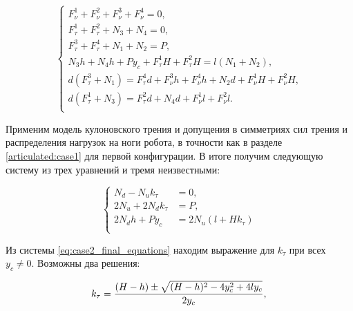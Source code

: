 \begin{equation}
  \label{articulated:case2_initial}
\left\{
  \begin{alignedat}{3}
    F_\nu^1 + F_\nu^2 + F_\nu^3 + F_\nu^4 = 0,\\
    F_\tau^1 + F_\tau^2 + N_3 + N_4 = 0,\\
    F_\tau^3 + F_\tau^4 + N_1 + N_2 = P,\\
    N_3 h + N_4 h + P y_c + F_\tau^1 H + F_\tau^2 H = l (N_1 + N_2),\\
    d (F_\tau^3 + N_1) = F_\tau^4 d + F_\nu^3 h + F_\nu^4 h + N_2 d + F_\nu^1 H + F_\nu^2 H,\\
    d (F_\tau^1 + N_3) = F_\tau^2 d + N_4 d + F_\nu^1 l + F_\nu^2 l.\\
  \end{alignedat}
\right.
\end{equation}

 Применим модель кулоновского трения и допущения в симметриях сил трения и распределения нагрузок на ноги робота, в точности как в разделе \ref{articulated:case1} для первой конфигурации. В итоге получим следующую систему из трех  уравнений и тремя неизвестными:

\begin{equation}
\label{eq:case2_final_equations}
\left\{
\begin{alignedat}{3}
  N_d - N_uk_\tau &= 0,\\
  2N_u + 2N_d k_\tau &= P,\\
  2 N_d h + P y_c &= 2 N_u (l + H k_\tau)\\
  \end{alignedat}
\right.
\end{equation}


Из системы \ref{eq:case2_final_equations} находим выражение для  $k_\tau$ при всех $y_c \ne 0$. Возможны два решения:

\begin{equation}
\label{eq:case2_k12}
      k_\tau = \dfrac{(H-h) \pm \sqrt{(H-h)^2 - 4y^2_c + 4ly_c}}{2y_c}, \\
\end{equation}

